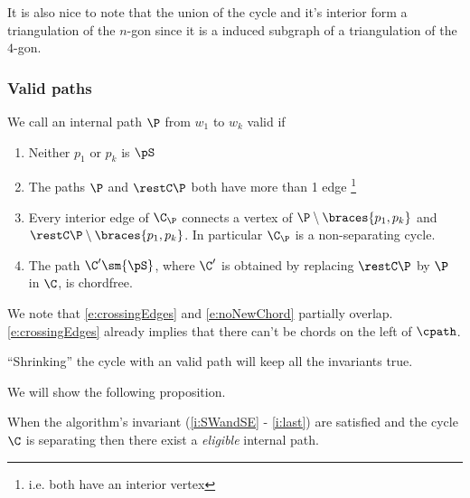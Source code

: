 It is also nice to note that the union of the cycle and it's interior form a triangulation of the $n$-gon since it is a induced subgraph of a triangulation of the $4$-gon.


\subsubsection{Valid paths}

\begin{defi}
We call an internal path $\P$ from $w_1$ to $w_k$ valid if
\begin{enumerate}
 \renewcommand*{\labelenumi}{(E\arabic{enumi})}%
 \renewcommand*{\theenumi}{(E\arabic{enumi})}%


\item Neither $p_1$ or $p_k$ is $\pS$
\label{e:noS}

\item The paths $\P$ and $\restC \P$ both have more than 1 edge \footnote{i.e. both have an interior vertex}
\label{e:longBorders}

\item Every interior edge of $\C_\P$ connects a vertex of $\P\setminus{\braces{p_1,p_k}}$ and $\restC \P \setminus{\braces{p_1,p_k}}$. In particular $\C_\P$ is a non-separating cycle.
\label{e:crossingEdges}

\item The path $\C'\sm{\pS}$, where $\C'$ is obtained by replacing $\restC \P$ by $\P$ in $\C$, is chordfree.
\label{e:noNewChord}

\end{enumerate}
\end{defi}

We note that \ref{e:crossingEdges} and \ref{e:noNewChord} partially overlap. \ref{e:crossingEdges} already implies that there can't be chords on the left of $\cpath$.


\begin{remark}
``Shrinking'' the cycle with an valid path will keep all the invariants true.
\end{remark}

We will show the following proposition.



\begin{thrm}
\label{th:eligExistence}
When the algorithm's invariant (\ref{i:SWandSE} - \ref{i:last}) are satisfied and the cycle $\C$ is separating then there exist a \emph{eligible} internal path.
\end{thrm}

